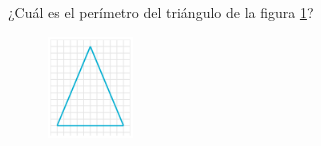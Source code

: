 ¿Cuál es el perímetro del triángulo de la figura \ref{fig:peri_isos_01}?
\begin{figure}[H]
    \begin{center}
        \includegraphics[width=0.2\textwidth]{../images/peri_isos_01.png}
    \end{center}
    \caption{}
    \label{fig:peri_isos_01}
\end{figure}